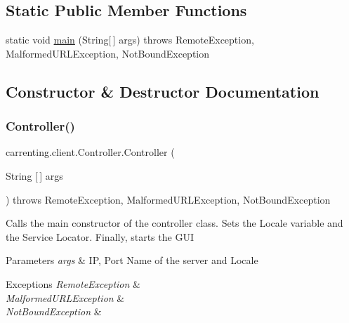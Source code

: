 \subsection*{Static Public Member Functions}
\begin{DoxyCompactItemize}
\item 
static void \mbox{\hyperlink{classcarrenting_1_1client_1_1_controller_acff3740c4a8e0d3788748ac27206b371}{main}} (String\mbox{[}$\,$\mbox{]} args)  throws Remote\+Exception, Malformed\+U\+R\+L\+Exception, Not\+Bound\+Exception 
\end{DoxyCompactItemize}


\subsection{Constructor \& Destructor Documentation}
\mbox{\label{classcarrenting_1_1client_1_1_controller_a54c511ae5355b24a7215c181cefb1846}} 
\subsubsection{\texorpdfstring{Controller()}{Controller()}\hspace{0.1cm}{\footnotesize\ttfamily [1/2]}}
{\footnotesize\ttfamily carrenting.\+client.\+Controller.\+Controller (\begin{DoxyParamCaption}\item[{String \mbox{[}$\,$\mbox{]}}]{args }\end{DoxyParamCaption}) throws Remote\+Exception, Malformed\+U\+R\+L\+Exception, Not\+Bound\+Exception}

Calls the main constructor of the controller class. Sets the Locale variable and the Service Locator. Finally, starts the G\+UI


\begin{DoxyParams}{Parameters}
{\em args} & IP, Port Name of the server and Locale \\
\hline
\end{DoxyParams}

\begin{DoxyExceptions}{Exceptions}
{\em Remote\+Exception} & \\
\hline
{\em Malformed\+U\+R\+L\+Exception} & \\
\hline
{\em Not\+Bound\+Exception} & \\
\hline
\end{DoxyExceptions}
\mbox{\label{classcarrenting_1_1client_1_1_controller_aa2cbbf30110eecbf9cb7dd0a57cc8a4c}} 
